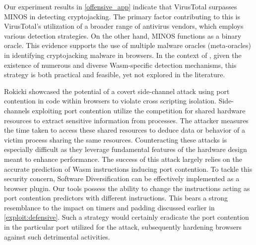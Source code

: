\begin{strategy}
    \label{meta-oracles}
    Our experiment results in \autoref{offensive_app}  indicate that VirusTotal surpasses MINOS in detecting \Wasm cryptojacking. 
    The primary factor contributing to this is VirusTotal's utilization of a broader range of antivirus vendors, which employs various detection strategies. 
    On the other hand, MINOS functions as a binary oracle. 
    This evidence supports the use of multiple malware oracles (meta-oracles) in identifying cryptojacking malware in browsers. 
    In the context of \Wasm, given the existence of numerous and diverse Wasm-specific detection mechanisms, this strategy is both practical and feasible, yet not explored in the literature.
\end{strategy}
    
\begin{strategy}
    Rokicki \etal  \cite{10.1145/3488932.3517411} showcased the potential of a covert side-channel attack using port contention in \Wasm code within browsers to violate cross scripting isolation.
    Side-channels exploiting port contention utilize the competition for shared hardware resources to extract sensitive information from processes. 
    The attacker measures the time taken to access these shared resources to deduce data or behavior of a victim process sharing the same resources. 
    Counteracting these attacks is especially difficult as they leverage fundamental features of the hardware design meant to enhance performance. 
    The success of this attack largely relies on the accurate prediction of Wasm instructions inducing port contention. 
    To tackle this security concern, \Wasm Software Diversification can be effectively implemented as a browser plugin. 
    Our tools possess the ability to change the \Wasm instructions acting as port contention predictors with different instructions. 
    This bears a strong resemblance to the impact on timers and padding discussed earlier in \autoref{exploit:defensive}. 
    Such a strategy would certainly eradicate the port contention in the particular port utilized for the attack, subsequently hardening browsers against such detrimental activities.

\end{strategy}


\begin{comment}
    
    \wrule{Dataset augmentation:} The \Wasm ecosystem is still in its infancy compared to more mature programming environments. 
    The study by Hilbig \etal  in 2021 found only 8,000 unique \Wasm binaries globally\cite{Hilbig2021AnES}, a fraction of the 1.5 million and 1.7 million packages available in npm and PyPI, respectively. 
    This limited dataset poses challenges for machine learning-based analysis tools, which require extensive data for effective training. 
    The scarcity of \Wasm programs also exacerbates the problem of software monoculture, increasing the risk of compromised \Wasm programs being consumed\cite{usenixWasm2020}. 
\end{comment}


